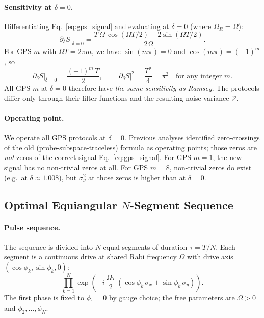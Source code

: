 \documentclass[12pt]{article}
\begin{document}
\paragraph{Sensitivity at $\delta = 0$.}
Differentiating Eq.~\eqref{eq:gps_signal} and evaluating at $\delta = 0$
(where $\Omega_R = \Omega$):
\begin{equation}
    \left.\partial_\delta S\right|_{\delta=0}
    = \frac{T\,\Omega\,\cos(\Omega T/2) - 2\sin(\Omega T/2)}{2\Omega}.
    \label{eq:gps_deriv}
\end{equation}
For GPS $m$ with $\Omega T = 2\pi m$, we have $\sin(m\pi) = 0$ and
$\cos(m\pi) = (-1)^m$, so
\begin{equation}
    \left.\partial_\delta S\right|_{\delta=0}
    = \frac{(-1)^m\, T}{2},
    \qquad
    \left|\partial_\delta S\right|^2 = \frac{T^2}{4} = \pi^2
    \quad\text{for any integer }m.
    \label{eq:gps_sens}
\end{equation}
All GPS $m$ at $\delta = 0$ therefore have \emph{the same sensitivity as
Ramsey}.  The protocols differ only through their filter functions and the
resulting noise variance $\mathcal{V}$.

\paragraph{Operating point.}
We operate all GPS protocols at $\delta = 0$.  Previous analyses identified
zero-crossings of the old (probe-subspace-traceless) formula as operating points;
those zeros are \emph{not} zeros of the correct signal
Eq.~\eqref{eq:gps_signal}.  For GPS $m=1$, the new signal has no non-trivial
zeros at all.  For GPS $m=8$, non-trivial zeros do exist (e.g.\ at
$\delta \approx 1.008$), but $\sigma^2_\nu$ at those zeros is higher than at $\delta = 0$.


\subsection{Optimal Equiangular $N$-Segment Sequence}

\paragraph{Pulse sequence.}
The sequence is divided into $N$ equal segments of duration $\tau = T/N$.
Each segment is a continuous drive at shared Rabi frequency
$\Omega$ with drive axis $(\cos\phi_k, \sin\phi_k, 0)$:
\begin{equation}
    \prod_{k=1}^{N} \exp\!\left(-i\,\frac{\Omega\tau}{2}\,
    (\cos\phi_k\,\sigma_x + \sin\phi_k\,\sigma_y)\right).
    \label{eq:eq_seq}
\end{equation}
The first phase is fixed to $\phi_1 = 0$ by gauge choice; the free parameters are
$\Omega > 0$ and $\phi_2, \ldots, \phi_N$.
\end{document}
